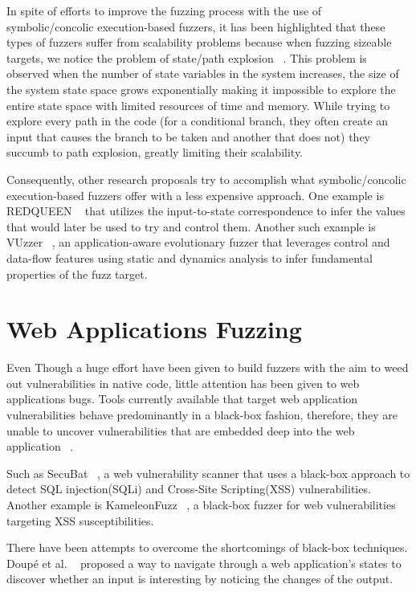 In spite of efforts to improve the fuzzing process with the use of symbolic/concolic execution-based fuzzers, it has been highlighted that these types of fuzzers suffer from scalability problems because when fuzzing sizeable targets, we notice the problem of state/path explosion ~\cite{Clarke2012}. This problem is observed when the number of state variables in the system increases, the size of the system state space grows exponentially making it impossible to explore the entire state space with limited resources of time and memory. While trying to explore every path in the code (\ie for a conditional branch, they often create an input that causes the branch to be taken and another that does not) they succumb to path explosion, greatly limiting their scalability.

Consequently, other research proposals try to accomplish what symbolic/concolic execution-based fuzzers offer with a less expensive approach. One example is REDQUEEN ~\cite{aschermann2019redqueen} that utilizes the input-to-state correspondence to infer the values that would later be used to try and control them. Another such example is VUzzer ~\cite{rawat2017vuzzer}, an application-aware evolutionary fuzzer that leverages control and data-flow features using static and dynamics analysis to infer fundamental properties of the fuzz target.

\section{Web Applications Fuzzing}
Even Though a huge effort have been given to build fuzzers with the aim to weed out vulnerabilities in native code, little attention has been given to web applications bugs. Tools currently available that target web application vulnerabilities behave predominantly in a black-box fashion, therefore, they are unable to uncover vulnerabilities that are embedded deep into the web application ~\cite{bau2010state, doupe2010johnny}.
 
Such as SecuBat ~\cite{kals2006secubat}, a web vulnerability scanner that uses a black-box approach to detect SQL injection(SQLi) and Cross-Site Scripting(XSS) vulnerabilities. Another example is KameleonFuzz ~\cite{duchene2014kameleonfuzz}, a black-box fuzzer for web vulnerabilities targeting XSS susceptibilities.

There have been attempts to overcome the shortcomings of black-box techniques. Doupé et al. ~\cite{doupe2012enemy} proposed a way to navigate through a web application's states to discover whether an input is interesting by noticing the changes of the output. 

